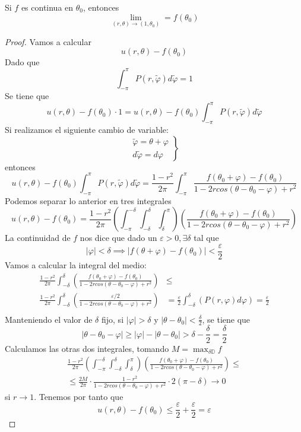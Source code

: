 \begin{theorem}

Si $f$ es continua en $\theta_0$, entonces
$$\lim_{(r,\theta)\to(1,\theta_0)}=f(\theta_0)$$
\end{theorem}
\begin{proof}
Vamos a calcular
$$u(r,\theta)-f(\theta_0)$$
Dado que $$\int_{-\pi}^{\pi}P(r,\tilde{\varphi})d\tilde{\varphi} = 1$$
Se tiene que 
$$u(r,\theta)-f(\theta_0)\cdot 1 = u(r,\theta)-f(\theta_0)\int_{-\pi}^{\pi}P(r,\tilde{\varphi})d\tilde{\varphi}$$
Si realizamos el siguiente cambio de variable:
\begin{equation*}
\left.
\begin{array}{l}
\tilde{\varphi} = \theta+\varphi\\
d\tilde{\varphi} = d\varphi
\end{array}
\right\}
\end{equation*}
entonces
$$u(r,\theta)-f(\theta_0)\int_{-\pi}^{\pi}P(r,\tilde{\varphi})d\tilde{\varphi}=\frac{1-r^2}{2\pi}\int_{-\pi}^{\pi}\frac{f(\theta_0+\varphi)-f(\theta_0)}{1-2rcos(\theta-\theta_0-\varphi)+r^2}$$
Podemos separar lo anterior en tres integrales
$$u(r,\theta)-f(\theta_0)=\frac{1-r^2}{2\pi}\left(\int_{-\pi}^{-\delta}\int_{-\delta}^{\delta}\int_{\delta}^{\pi}\right)\left(\frac{f(\theta_0+\varphi)-f(\theta_0)}{1-2rcos(\theta-\theta_0-\varphi)+r^2}\right)$$
La continuidad de $f$ nos dice que dado un $\varepsilon>0, \exists\delta$ tal que
$$|\varphi|<\delta \implies |f(\theta+\varphi)-f(\theta_0)| < \frac{\varepsilon}{2}$$
Vamos a calcular la integral del medio:
\begin{align*}
\frac{1-r^2}{2\pi}\int_{-\delta}^{\delta}\left(\frac{f(\theta_0+\varphi)-f(\theta_0)}{1-2rcos(\theta-\theta_0-\varphi)+r^2}\right) & \le \\
\frac{1-r^2}{2\pi}\int_{-\delta}^{\delta}\left(\frac{\varepsilon/2}{1-2rcos(\theta-\theta_0-\varphi)+r^2}\right) & =
\frac{\varepsilon}{2}\int_{-\delta}^{\delta}\left(P(r,\varphi)d\varphi\right) = \frac{\varepsilon}{2}\\
\end{align*}
Manteniendo el valor de $\delta$ fijo, si $|\varphi| > \delta$ y $|\theta-\theta_0|<\frac{\delta}{2}$, se tiene que
$$|\theta-\theta_0-\varphi| \ge |\varphi|-|\theta-\theta_0|>\delta-\frac{\delta}{2} = \frac{\delta}{2}$$
Calculamos las otras dos integrales, tomando $M=\max_{\delta\mathbb{D}}f$
\begin{align*}
\frac{1-r^2}{2\pi}\left(\int_{-\pi}^{-\delta}\int_{-\delta}^{\delta}\int_{\delta}^{\pi}\right)\left(\frac{f(\theta_0+\varphi)-f(\theta_0)}{1-2rcos(\theta-\theta_0-\varphi)+r^2}\right)\le \\
\le \frac{2M}{2\pi}\cdot\frac{1-r^2}{1-2rcos(\theta-\theta_0-\varphi)+r^2}\cdot 2(\pi-\delta)\to 0
\end{align*}
si $r\to 1$.
Tenemos por tanto que
$$u(r,\theta)-f(\theta_0) \le \frac{\varepsilon}{2} + \frac{\varepsilon}{2} = \varepsilon$$
\end{proof}